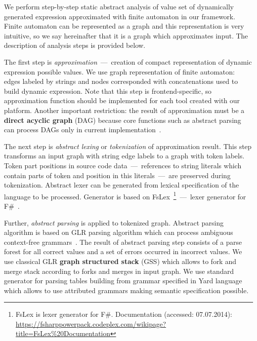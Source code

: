 \documentclass{acm_proc_article-sp}
\begin{document}
We perform step-by-step static abstract analysis of value set of dynamically generated expression approximated with finite automaton in our framework. Finite automaton can be represented as a graph and this representation is very intuitive, so we say hereinafter that it is a graph which approximates input. The description of analysis steps is provided below. 

The first step is {\it approximation}~---~creation of compact representation of dynamic expression possible values. We use graph representation of finite automaton: edges labeled by strings and nodes corresponded with concatenations used to build dynamic expression. Note that this step is frontend-specific, so approximation function should be implemented for each tool created with our platform. Another important restriction: the result of approximation must be a {\bf direct acyclic graph} (DAG) because core functions such as abstract parsing can process DAGs only in current implementation~\cite{AGLR}.

The next step is {\it abstract lexing} or {\it tokenization} of approximation result. This step transforms an input graph with string edge labels to a graph with token labels. Token part positions in source code data~---~references to string literals which contain parts of token and position in this literals~---~are preserved during tokenization. Abstract lexer can be generated from lexical specification of the language to be processed. Generator is based on FsLex~\footnote{FsLex is lexer generator for F\#. Documentation (accessed: 07.07.2014): \url{https://fsharppowerpack.codeplex.com/wikipage?title=FsLex\%20Documentation}}~---~lexer generator for F\#~\cite{FS}. 

Further, {\it abstract parsing} is applied to tokenized graph. Abstract parsing algorithm is based on GLR parsing algorithm which can process ambiguous context-free grammars~\cite{AGLR}. The result of abstract parsing step consists of a parse forest for all correct values and a set of errors occurred in incorrect values. We use classical GLR {\bf graph structured stack} (GSS) which allows to fork and merge stack according to forks and merges in input graph. We use standard generator for parsing tables building from grammar specified in Yard language~\cite{YARD} which allows to use attributed grammars making semantic specification possible. 
\end{document}
